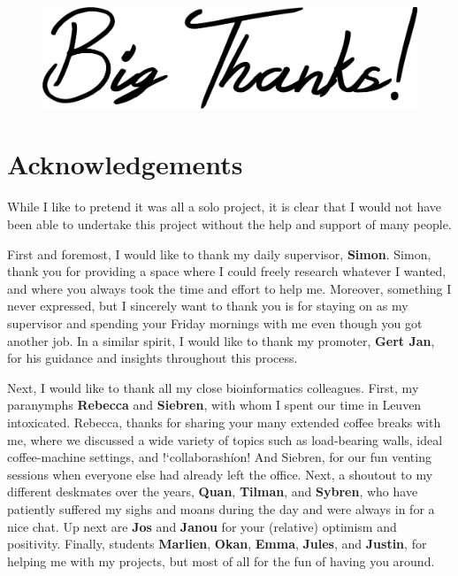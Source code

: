 \vspace*{\fill}
\begin{figure}[H]
    \centering
    \includegraphics[width=0.8\linewidth]{ch.appendix/imgs/bigthanks.png}
\end{figure}
\vspace*{\fill}

\newpage

\section{Acknowledgements}

\noindent
While I like to pretend it was all a solo project, it is clear that I would not have been able to undertake this project without the help and support of many people.

\bigbreak \noindent
First and foremost, I would like to thank my daily supervisor, \textbf{Simon}. Simon, thank you for providing a space where I could freely research whatever I wanted, and where you always took the time and effort to help me. Moreover, something I never expressed, but I sincerely want to thank you is for staying on as my supervisor and spending your Friday mornings with me even though you got another job. In a similar spirit, I would like to thank my promoter, \textbf{Gert Jan}, for his guidance and insights throughout this process.

\bigbreak \noindent
Next, I would like to thank all my close bioinformatics colleagues. First, my paranymphs \textbf{Rebecca} and \textbf{Siebren}, with whom I spent our time in Leuven intoxicated. Rebecca, thanks for sharing your many extended coffee breaks with me, where we discussed a wide variety of topics such as load-bearing walls, ideal coffee-machine settings, and !`collaborash\'ion! And Siebren, for our fun venting sessions when everyone else had already left the office. Next, a shoutout to my different deskmates over the years, \textbf{Quan}, \textbf{Tilman}, and \textbf{Sybren}, who have patiently suffered my sighs and moans during the day and were always in for a nice chat. Up next are \textbf{Jos} and \textbf{Janou} for your (relative) optimism and positivity. Finally,  students \textbf{Marlien}, \textbf{Okan}, \textbf{Emma}, \textbf{Jules}, and \textbf{Justin}, for helping me with my projects, but most of all for the fun of having you around. 

